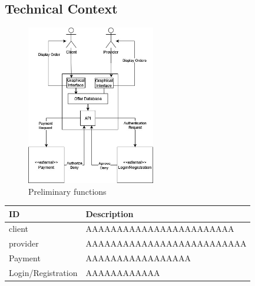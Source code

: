 \subsection{Technical Context}

\begin{figure}[H]
    \centering
    \includegraphics[width=0.5\textwidth]{assets/technical_context.jpg}
    \caption{Preliminary functions}
    \label{fig:technical_context}
\end{figure}

\begin{table}[H]
    \begin{tabularx}{\textwidth}{lX}
    \toprule
    ID & Description   \\
    \midrule
    \gls{client} & AAAAAAAAAAAAAAAAAAAAAAAA \\
    \gls{provider} & AAAAAAAAAAAAAAAAAAAAAAAAAA \\
    Payment & AAAAAAAAAAAAAAAAA \\
    Login/Registration & AAAAAAAAAAAA  \\
    \bottomrule
    \end{tabularx}
\end{table}